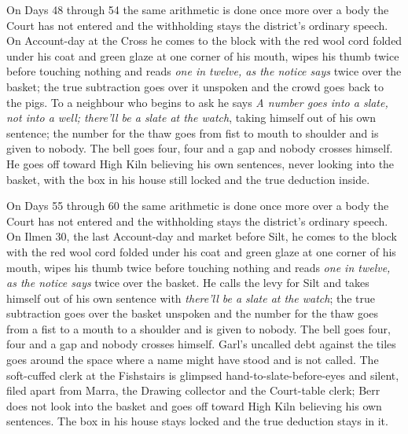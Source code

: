 \documentclass{design/chronicle}
\begin{document}
{On Days 48 through 54 the same arithmetic is done once more over a body the Court has not entered and the withholding stays the district’s ordinary speech. On Account-day at the Cross he comes to the block with the red wool cord folded under his coat and green glaze at one corner of his mouth, wipes his thumb twice before touching nothing and reads \emph{one in twelve, as the notice says} twice over the basket; the true subtraction goes over it unspoken and the crowd goes back to the pigs. To a neighbour who begins to ask he says \emph{A number goes into a slate, not into a well; there’ll be a slate at the watch}, taking himself out of his own sentence; the number for the thaw goes from fist to mouth to shoulder and is given to nobody. The bell goes four, four and a gap and nobody crosses himself. He goes off toward High Kiln believing his own sentences, never looking into the basket, with the box in his house still locked and the true deduction inside.

On Days 55 through 60 the same arithmetic is done once more over a body the Court has not entered and the withholding stays the district’s ordinary speech. On Ilmen 30, the last Account-day and market before Silt, he comes to the block with the red wool cord folded under his coat and green glaze at one corner of his mouth, wipes his thumb twice before touching nothing and reads \emph{one in twelve, as the notice says} twice over the basket. He calls the levy for Silt and takes himself out of his own sentence with \emph{there’ll be a slate at the watch}; the true subtraction goes over the basket unspoken and the number for the thaw goes from a fist to a mouth to a shoulder and is given to nobody. The bell goes four, four and a gap and nobody crosses himself. Garl’s uncalled debt against the tiles goes around the space where a name might have stood and is not called. The soft-cuffed clerk at the Fishstairs is glimpsed hand-to-slate-before-eyes and silent, filed apart from Marra, the Drawing collector and the Court-table clerk; Berr does not look into the basket and goes off toward High Kiln believing his own sentences. The box in his house stays locked and the true deduction stays in it.

}
\end{document}
